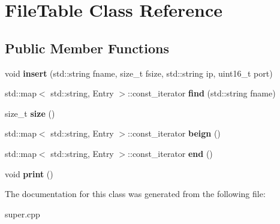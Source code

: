 \hypertarget{classFileTable}{}\section{File\+Table Class Reference}
\label{classFileTable}
\subsection*{Public Member Functions}
\begin{DoxyCompactItemize}
\item 
void {\bfseries insert} (std\+::string fname, size\+\_\+t fsize, std\+::string ip, uint16\+\_\+t port)\hypertarget{classFileTable_a7d5b184a90260b6272e6afa1e719c6b8}{}\label{classFileTable_a7d5b184a90260b6272e6afa1e719c6b8}

\item 
std\+::map$<$ std\+::string, Entry $>$\+::const\+\_\+iterator {\bfseries find} (std\+::string fname)\hypertarget{classFileTable_a9e4e2ab0bc0f248a12656ff97000e9ad}{}\label{classFileTable_a9e4e2ab0bc0f248a12656ff97000e9ad}

\item 
size\+\_\+t {\bfseries size} ()\hypertarget{classFileTable_a80a5e2ecc2229bb02a451f66d5cb3e87}{}\label{classFileTable_a80a5e2ecc2229bb02a451f66d5cb3e87}

\item 
std\+::map$<$ std\+::string, Entry $>$\+::const\+\_\+iterator {\bfseries beign} ()\hypertarget{classFileTable_a173fc365feb6a20c8531f8c731bcc7c4}{}\label{classFileTable_a173fc365feb6a20c8531f8c731bcc7c4}

\item 
std\+::map$<$ std\+::string, Entry $>$\+::const\+\_\+iterator {\bfseries end} ()\hypertarget{classFileTable_aae5fdbef3e406b6a2a475ca74dc8f75a}{}\label{classFileTable_aae5fdbef3e406b6a2a475ca74dc8f75a}

\item 
void {\bfseries print} ()\hypertarget{classFileTable_ab9b62d0b7cd222d55f92ce7f6991a77b}{}\label{classFileTable_ab9b62d0b7cd222d55f92ce7f6991a77b}

\end{DoxyCompactItemize}


The documentation for this class was generated from the following file\+:\begin{DoxyCompactItemize}
\item 
super.\+cpp\end{DoxyCompactItemize}
